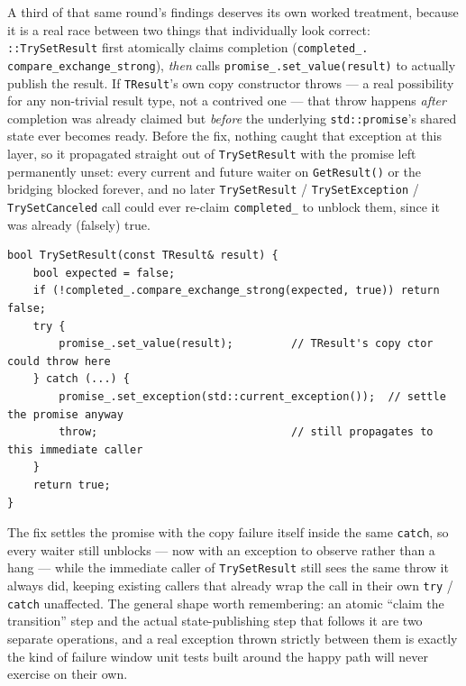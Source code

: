 A third of that same round's findings deserves its own worked treatment, because it is a real
race between two things that individually look correct: %
\texttt{::TrySetResult} first atomically claims completion (\texttt{completed\_.%
compare\_exchange\_strong}), \emph{then} calls \texttt{promise\_.set\_value(result)} to actually
publish the result. If \texttt{TResult}'s own copy constructor throws --- a real possibility for
any non-trivial result type, not a contrived one --- that throw happens \emph{after} completion
was already claimed but \emph{before} the underlying \texttt{std::promise}'s shared state ever
becomes ready. Before the fix, nothing caught that exception at this layer, so it propagated
straight out of \texttt{TrySetResult} with the promise left permanently unset: every current and
future waiter on \texttt{GetResult()} or the bridging  blocked forever, and no
later \texttt{TrySetResult} / \texttt{TrySetException} / \texttt{TrySetCanceled} call could ever
re-claim \texttt{completed\_} to unblock them, since it was already (falsely) true.

\begin{lstlisting}
bool TrySetResult(const TResult& result) {
    bool expected = false;
    if (!completed_.compare_exchange_strong(expected, true)) return false;
    try {
        promise_.set_value(result);         // TResult's copy ctor could throw here
    } catch (...) {
        promise_.set_exception(std::current_exception());  // settle the promise anyway
        throw;                              // still propagates to this immediate caller
    }
    return true;
}
\end{lstlisting}

The fix settles the promise with the copy failure itself inside the same \texttt{catch}, so
every waiter still unblocks --- now with an exception to observe rather than a hang --- while
the immediate caller of \texttt{TrySetResult} still sees the same throw it always did, keeping
existing callers that already wrap the call in their own \texttt{try} / \texttt{catch} unaffected.
The general shape worth remembering: an atomic ``claim the transition'' step and the actual
state-publishing step that follows it are two separate operations, and a real exception thrown
strictly between them is exactly the kind of failure window unit tests built around the happy
path will never exercise on their own.


